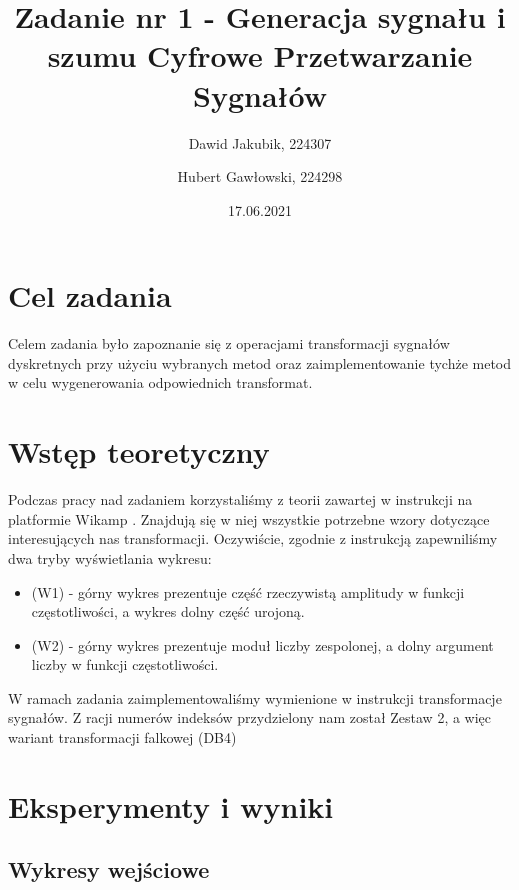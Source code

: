 \documentclass[12pt]{article}
\title{{\bf Zadanie nr 1 - Generacja sygnału i szumu}\linebreak
Cyfrowe Przetwarzanie Sygnałów}
\author{Dawid Jakubik, 224307 \and Hubert Gawłowski, 224298}
\date{17.06.2021}
\begin{document}
\clearpage\maketitle
\thispagestyle{empty}
\newpage
\setcounter{page}{1}
\section{Cel zadania}

Celem zadania było zapoznanie się z operacjami transformacji sygnałów dyskretnych przy użyciu wybranych metod oraz zaimplementowanie tychże metod w celu wygenerowania odpowiednich transformat.

\section{Wstęp teoretyczny}
Podczas pracy nad zadaniem korzystaliśmy z teorii zawartej w instrukcji na platformie Wikamp \cite{instrukcja}. Znajdują się w niej wszystkie potrzebne wzory dotyczące interesujących nas transformacji.
Oczywiście, zgodnie z instrukcją zapewniliśmy dwa tryby wyświetlania wykresu:
\begin{itemize}
    \item (W1) - górny wykres prezentuje część rzeczywistą amplitudy w funkcji częstotliwości, a wykres dolny część urojoną.
    \item (W2) - górny wykres prezentuje moduł liczby zespolonej, a dolny argument liczby w funkcji częstotliwości.
\end{itemize}
W ramach zadania zaimplementowaliśmy wymienione w instrukcji transformacje sygnałów. Z racji numerów indeksów przydzielony nam został Zestaw 2, a więc wariant transformacji falkowej (DB4)


\section{Eksperymenty i wyniki}


\subsection{Wykresy wejściowe}
\end{document}
